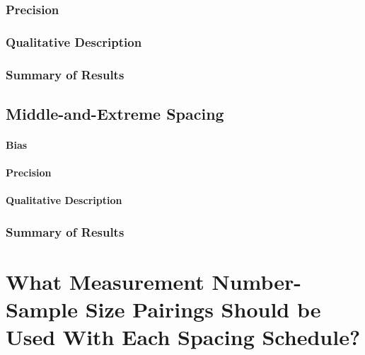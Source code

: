 \documentclass[
12pt, %
twoside,
english]{guelphthesis}
\begin{document}
\hypertarget{precision-time-dec-exp2}{%
\subsubsection{Precision}\label{precision-time-dec-exp2}}

\hypertarget{qualitative-time-dec-exp2}{%
\subsubsection{Qualitative Description}\label{qualitative-time-dec-exp2}}

\hypertarget{summary-of-results-6}{%
\subsubsection{Summary of Results}\label{summary-of-results-6}}

\hypertarget{middle-and-extreme-spacing-1}{%
\subsection{Middle-and-Extreme Spacing}\label{middle-and-extreme-spacing-1}}

\hypertarget{bias-mid-ext-exp2}{%
\paragraph{Bias}\label{bias-mid-ext-exp2}}

\hypertarget{precision-mid-ext-exp2}{%
\paragraph{Precision}\label{precision-mid-ext-exp2}}

\hypertarget{qualitative-mid-ext-exp2}{%
\paragraph{Qualitative Description}\label{qualitative-mid-ext-exp2}}

\hypertarget{summary-of-results-7}{%
\subsubsection{Summary of Results}\label{summary-of-results-7}}

\hypertarget{what-measurement-number-sample-size-pairings-should-be-used-with-each-spacing-schedule}{%
\section{What Measurement Number-Sample Size Pairings Should be Used With Each Spacing Schedule?}\label{what-measurement-number-sample-size-pairings-should-be-used-with-each-spacing-schedule}}
\end{document}
